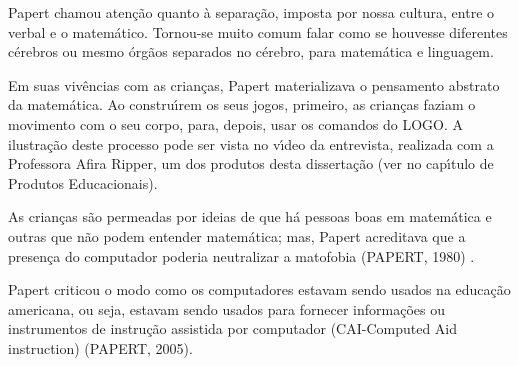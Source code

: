 \documentclass[
12pt,		%
openright,	%
twoside,  %
a4paper,			%
chapter=TITLE,		%
english,			%
french,				%
spanish,			%
brazil				%
]{USPSC-classe/USPSC}
\begin{document}
Papert chamou aten\c{c}\~ao quanto \`a separa\c{c}\~ao, imposta por nossa cultura, entre o verbal e o matem\'atico. Tornou-se muito comum falar como se houvesse diferentes c\'erebros ou mesmo \'org\~aos separados no c\'erebro, para matem\'atica e linguagem.

















Em suas viv\^encias com as crian\c{c}as, Papert materializava o pensamento abstrato da matem\'atica. Ao constru\'{\i}rem os seus jogos, primeiro, as crian\c{c}as faziam o movimento com o seu corpo, para, depois, usar os comandos do LOGO. A ilustra\c{c}\~ao deste processo pode ser vista no v\'{\i}deo  da entrevista, realizada com a Professora Afira Ripper,  um dos produtos desta disserta\c{c}\~ao (ver no cap\'{\i}tulo de Produtos Educacionais).

















As crian\c{c}as s\~ao permeadas por ideias de que h\'a pessoas boas em matem\'atica e outras que n\~ao podem entender matem\'atica; mas, Papert acreditava que a presen\c{c}a do computador poderia neutralizar a matofobia (PAPERT, 1980) .

















Papert criticou o modo como os computadores estavam sendo usados na educa\c{c}\~ao americana, ou seja, estavam sendo usados para fornecer informa\c{c}\~oes ou instrumentos de instru\c{c}\~ao assistida por computador (CAI-Computed Aid instruction)  (PAPERT, 2005).
\end{document}
